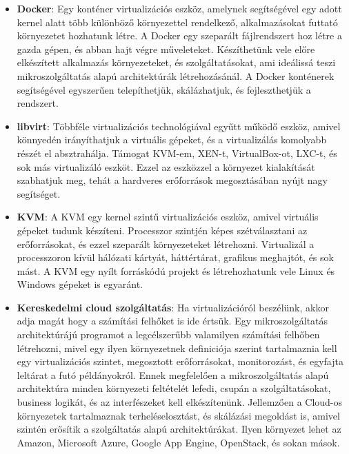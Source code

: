 \documentclass[11pt,magyar,a4paper,twoside,]{report}
\begin{document}
\begin{itemize}
\item
  \textbf{Docker}\citep{docker}: Egy konténer virtualizációs eszköz,
  amelynek segítségével egy adott kernel alatt több különböző
  környezettel rendelkező, alkalmazásokat futtató környezetet hozhatunk
  létre. A Docker egy szeparált fájlrendszert hoz létre a gazda gépen,
  és abban hajt végre műveleteket. Készíthetünk vele előre elkészített
  alkalmazás környezeteket, és szolgáltatásokat, ami ideálissá teszi
  mikroszolgáltatás alapú architektúrák létrehozásánál. A Docker
  konténerek segítségével egyszerűen telepíthetjük, skálázhatjuk, és
  fejleszthetjük a rendszert.
\item
  \textbf{libvirt}\citep{libvirt}: Többféle virtualizációs
  technológiával egyűtt működő eszköz, amivel könnyedén irányíthatjuk a
  virtuális gépeket, és a virtualizálás komolyabb részét el
  absztrahálja. Támogat KVM-em, XEN-t, VirtualBox-ot, LXC-t, és sok más
  virtualizáló eszköt. Ezzel az eszközzel a környezet kialakítását
  szabhatjuk meg, tehát a hardveres erőforrások megosztásában nyújt nagy
  segítséget.
\item
  \textbf{KVM}\citep{kvm}: A KVM egy kernel szintű virtualizációs
  eszköz, amivel virtuális gépeket tudunk készíteni. Processzor szintjén
  képes szétválasztani az erőforrásokat, és ezzel szeparált
  környezeteket létrehozni. Virtualizál a processzoron kívül hálózati
  kártyát, háttértárat, grafikus meghajtót, és sok mást. A KVM egy nyílt
  forráskódú projekt és létrehozhatunk vele Linux és Windows gépeket is
  egyaránt.
\item
  \textbf{Kereskedelmi cloud szolgáltatás}: Ha virtualizációról
  beszélünk, akkor adja magát hogy a számítási felhőket is ide értsük.
  Egy mikroszolgáltatás architektúrájú programot a legcélszerűbb
  valamilyen számítási felhőben létrehozni, mivel egy ilyen környezetnek
  definiciója szerint tartalmaznia kell egy virtualizációs szintet,
  megosztott erőforrásokat, monitorozást, és egyfajta leltárat a futó
  példányokról. Ennek megfelelően a mikroszolgáltatás alapú architektúra
  minden környezeti feltételét lefedi, csupán a szolgáltatásokat,
  business logikát, és az interfészeket kell elkészítenünk. Jellemzően a
  Cloud-os környezetek tartalmaznak terheléselosztást, és skálázási
  megoldást is, amivel szintén erősítik a szolgáltatás alapú
  architektúrákat. Ilyen környezet lehet az Amazon, Microsoft Azure,
  Google App Engine, OpenStack, és sokan mások.
\end{itemize}
\end{document}
